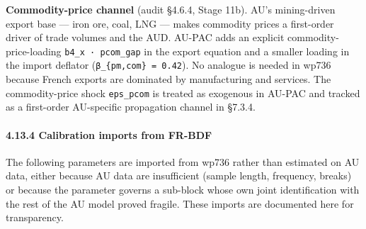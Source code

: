 \documentclass[
]{article}
\begin{document}
\textbf{Commodity-price channel} (audit §4.6.4, Stage 11b). AU's
mining-driven export base --- iron ore, coal, LNG --- makes commodity
prices a first-order driver of trade volumes and the AUD. AU-PAC adds an
explicit commodity-price-loading \texttt{b4\_x\ ·\ pcom\_gap} in the
export equation and a smaller loading in the import deflator
(\texttt{β\_\{pm,com\}\ =\ 0.42}). No analogue is needed in wp736
because French exports are dominated by manufacturing and services. The
commodity-price shock \texttt{eps\_pcom} is treated as exogenous in
AU-PAC and tracked as a first-order AU-specific propagation channel in
§7.3.4.

\paragraph{4.13.4 Calibration imports from
FR-BDF}\label{calibration-imports-from-fr-bdf}

The following parameters are imported from wp736 rather than estimated
on AU data, either because AU data are insufficient (sample length,
frequency, breaks) or because the parameter governs a sub-block whose
own joint identification with the rest of the AU model proved fragile.
These imports are documented here for transparency.
\end{document}
